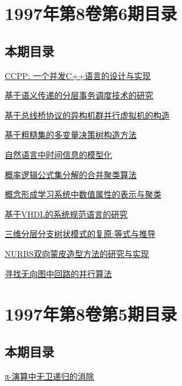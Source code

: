 \documentclass[a4paper]{article}
\begin{document}
\section{\textbf{1997年第8卷第6期目录}}
\subsection{本期目录}
\href{http://www.jos.org.cn/ch/reader/download_pdf.aspx?file_no=19970601&year_id=1997&quarter_id=6&falg=1}{CCPP: 一个并发C++语言的设计与实现}

\href{http://www.jos.org.cn/ch/reader/download_pdf.aspx?file_no=19970602&year_id=1997&quarter_id=6&falg=1}{基于语义传递的分层事务调度技术的研究}

\href{http://www.jos.org.cn/ch/reader/download_pdf.aspx?file_no=19970603&year_id=1997&quarter_id=6&falg=1}{基于总线桥协议的异构机群并行虚拟机的构造}

\href{http://www.jos.org.cn/ch/reader/download_pdf.aspx?file_no=19970604&year_id=1997&quarter_id=6&falg=1}{基于粗糙集的多变量决策树构造方法}

\href{http://www.jos.org.cn/ch/reader/download_pdf.aspx?file_no=19970605&year_id=1997&quarter_id=6&falg=1}{自然语言中时间信息的模型化}

\href{http://www.jos.org.cn/ch/reader/download_pdf.aspx?file_no=19970606&year_id=1997&quarter_id=6&falg=1}{概率逻辑公式集分解的合并聚类算法}

\href{http://www.jos.org.cn/ch/reader/download_pdf.aspx?file_no=19970607&year_id=1997&quarter_id=6&falg=1}{概念形成学习系统中数值属性的表示与聚类}

\href{http://www.jos.org.cn/ch/reader/download_pdf.aspx?file_no=19970608&year_id=1997&quarter_id=6&falg=1}{基于VHDL的系统规范语言的研究}

\href{http://www.jos.org.cn/ch/reader/download_pdf.aspx?file_no=19970609&year_id=1997&quarter_id=6&falg=1}{三维分层分支树状模式的复原:等式与推导}

\href{http://www.jos.org.cn/ch/reader/download_pdf.aspx?file_no=19970610&year_id=1997&quarter_id=6&falg=1}{NURBS双向蒙皮造型方法的研究与实现}

\href{http://www.jos.org.cn/ch/reader/download_pdf.aspx?file_no=19970611&year_id=1997&quarter_id=6&falg=1}{寻找无向图中回路的并行算法}


\section{\textbf{1997年第8卷第5期目录}}
\subsection{本期目录}
\href{http://www.jos.org.cn/ch/reader/download_pdf.aspx?file_no=19970501&year_id=1997&quarter_id=5&falg=1}{π-演算中无卫递归的消除}
\end{document}

